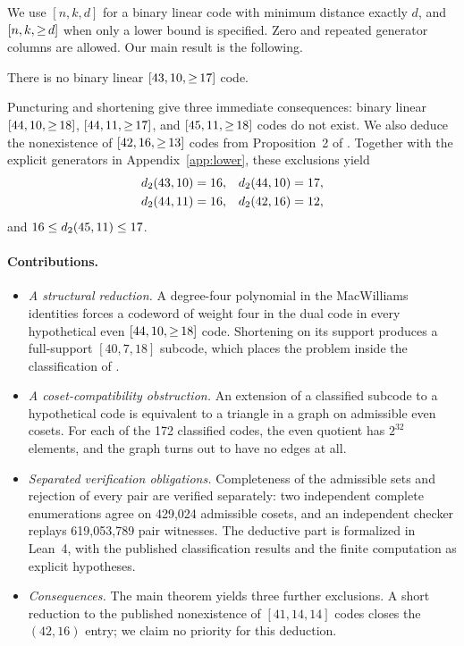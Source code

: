 We use $[n,k,d]$ for a binary linear code with minimum distance exactly $d$, and $\mbox{\ensuremath{[n,k,{\ge}\,d]}}$ when only a lower bound is specified. Zero and repeated generator columns are allowed. Our main result is the following.

\begin{theorem}\label{thm:main}
There is no binary linear $\mbox{\ensuremath{[43,10,{\ge}\,17]}}$ code.
\end{theorem}

Puncturing and shortening give three immediate consequences: binary linear $\mbox{\ensuremath{[44,10,{\ge}\,18]}}$, $\mbox{\ensuremath{[44,11,{\ge}\,17]}}$, and $\mbox{\ensuremath{[45,11,{\ge}\,18]}}$ codes do not exist. We also deduce the nonexistence of $\mbox{\ensuremath{[42,16,{\ge}\,13]}}$ codes from Proposition~2 of \citet{bouyuklieva2020}. Together with the explicit generators in Appendix~\ref{app:lower}, these exclusions yield
\begin{align*}
 d_2(43,10)&=16,&d_2(44,10)&=17,\\
 d_2(44,11)&=16,&d_2(42,16)&=12,
\end{align*}
and $16\le d_2(45,11)\le17$.

\paragraph{Contributions.}
\begin{itemize}
\item \emph{A structural reduction.} A degree-four polynomial in the MacWilliams identities forces a codeword of weight four in the dual code in every hypothetical even $\mbox{\ensuremath{[44,10,{\ge}\,18]}}$ code. Shortening on its support produces a full-support $[40,7,18]$ subcode, which places the problem inside the classification of \citet{bouyukliev2001}.
\item \emph{A coset-compatibility obstruction.} An extension of a classified subcode to a hypothetical code is equivalent to a triangle in a graph on admissible even cosets. For each of the 172 classified codes, the even quotient has $2^{32}$ elements, and the graph turns out to have no edges at all.
\item \emph{Separated verification obligations.} Completeness of the admissible sets and rejection of every pair are verified separately: two independent complete enumerations agree on 429,024 admissible cosets, and an independent checker replays 619,053,789 pair witnesses. The deductive part is formalized in Lean~4, with the published classification results and the finite computation as explicit hypotheses.
\item \emph{Consequences.} The main theorem yields three further exclusions. A short reduction to the published nonexistence of $[41,14,14]$ codes closes the $(42,16)$ entry; we claim no priority for this deduction.
\end{itemize}

